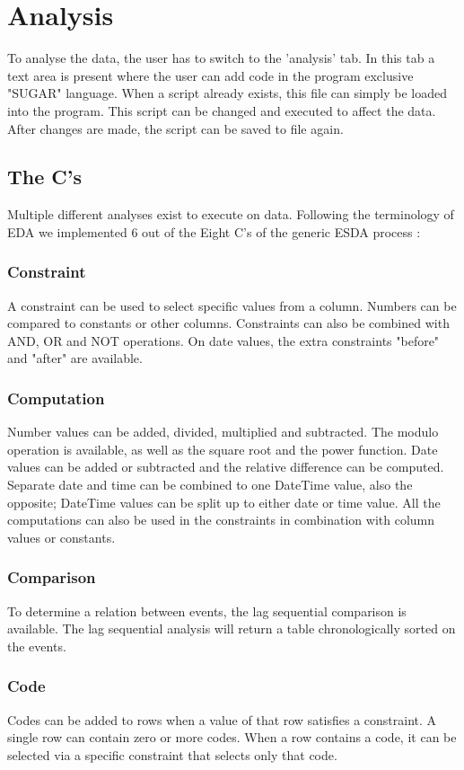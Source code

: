 \section{Analysis}
To analyse the data, the user has to switch to the 'analysis' tab. In this tab a text area is present where the user can add code in the program exclusive "SUGAR" language. When a script already exists, this file can simply be loaded into the program. This script can be changed and executed to affect the data. After changes are made, the script can be saved to file again. 
\subsection{The C's}
Multiple different analyses exist to execute on data. Following the terminology of EDA we implemented 6 out of the Eight C's of the generic ESDA process \cite{analysis}:
\subsubsection{Constraint}
A constraint can be used to select specific values from a column. Numbers can be compared to constants or other columns. Constraints can also be combined with AND, OR and NOT operations. On date values, the extra constraints "before" and "after" are available. 
\subsubsection{Computation}
Number values can be added, divided, multiplied and subtracted. The modulo operation is available, as well as the square root and the power function. Date values can be added or subtracted and the relative difference can be computed. Separate date and time can be combined to one DateTime value, also the opposite; DateTime values can be split up to either date or time value. All the computations can also be used in the constraints in combination with column values or constants.
\subsubsection{Comparison}
To determine a relation between events, the lag sequential comparison is available. The lag sequential analysis will return a table chronologically sorted on the events.
\subsubsection{Code}
Codes can be added to rows when a value of that row satisfies a constraint. A single row can contain zero or more codes. When a row contains a code, it can be selected via a specific constraint that selects only that code. 
